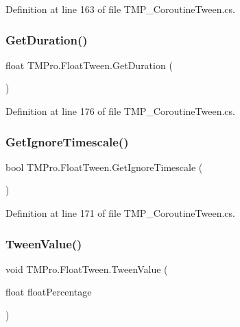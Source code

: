 Definition at line 163 of file T\+M\+P\+\_\+\+Coroutine\+Tween.\+cs.

\mbox{\label{struct_t_m_pro_1_1_float_tween_a4a7ba395bbd92d2dbfb57b305a71944d}} 
\subsubsection{\texorpdfstring{GetDuration()}{GetDuration()}}
{\footnotesize\ttfamily float T\+M\+Pro.\+Float\+Tween.\+Get\+Duration (\begin{DoxyParamCaption}{ }\end{DoxyParamCaption})}



Definition at line 176 of file T\+M\+P\+\_\+\+Coroutine\+Tween.\+cs.

\mbox{\label{struct_t_m_pro_1_1_float_tween_a01d7fe80680ceafebda7a94c0f59f8bf}} 
\subsubsection{\texorpdfstring{GetIgnoreTimescale()}{GetIgnoreTimescale()}}
{\footnotesize\ttfamily bool T\+M\+Pro.\+Float\+Tween.\+Get\+Ignore\+Timescale (\begin{DoxyParamCaption}{ }\end{DoxyParamCaption})}



Definition at line 171 of file T\+M\+P\+\_\+\+Coroutine\+Tween.\+cs.

\mbox{\label{struct_t_m_pro_1_1_float_tween_ae58254bf8799dddc55990ec1f0082c6d}} 
\subsubsection{\texorpdfstring{TweenValue()}{TweenValue()}}
{\footnotesize\ttfamily void T\+M\+Pro.\+Float\+Tween.\+Tween\+Value (\begin{DoxyParamCaption}\item[{float}]{float\+Percentage }\end{DoxyParamCaption})}



